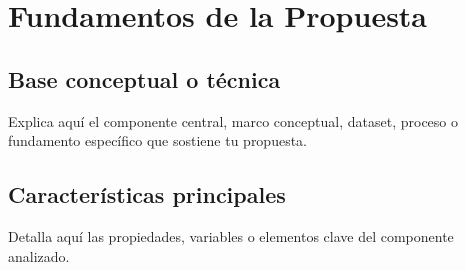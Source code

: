 \chapter{Fundamentos de la Propuesta}

\section{Base conceptual o técnica}

Explica aquí el componente central, marco conceptual, dataset, proceso o fundamento específico que sostiene tu propuesta.

\section{Características principales}

Detalla aquí las propiedades, variables o elementos clave del componente analizado.
